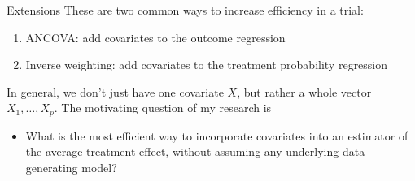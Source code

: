 \documentclass[10pt,t]{beamer}
\begin{document}
\begin{frame}{Extensions}
	These are two common ways to increase efficiency in a trial:
	\begin{enumerate}
		\item ANCOVA: add covariates to the outcome regression
		\item Inverse weighting: add covariates to the treatment probability regression
	\end{enumerate}
	In general, we don't just have one covariate $X$, but rather a whole vector $X_1,\dots, X_p$. The motivating question of my research is
	\begin{itemize}
		\item What is the most efficient way to incorporate covariates into an estimator of the average treatment effect, without assuming any underlying data generating model? 
	\end{itemize}
\end{frame}
\end{document}
